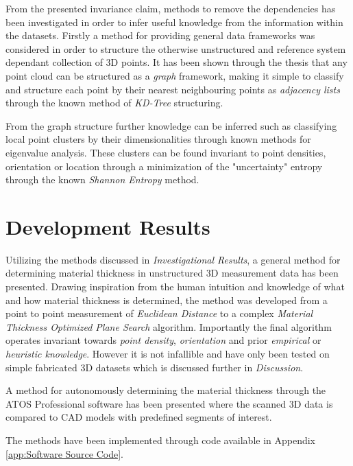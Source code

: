 \documentclass[%
]{USN-MSc}
\begin{document}
From the presented invariance claim, methods to remove the dependencies has been investigated in order to infer useful knowledge from the information within the datasets. Firstly a method for providing general data frameworks was considered in order to structure the otherwise unstructured and reference system dependant collection of 3D points. It has been shown through the thesis that any point cloud can be structured as a \textit{graph} framework, making it simple to classify and structure each point by their nearest neighbouring points as \textit{adjacency lists} through the known method of \textit{KD-Tree} structuring.

From the graph structure further knowledge can be inferred such as classifying local point clusters by their dimensionalities through known methods for eigenvalue analysis. These clusters can be found invariant to point densities, orientation or location through a minimization of the "uncertainty" entropy through the known \textit{Shannon Entropy} method.

\section{Development Results}
Utilizing the methods discussed in \textit{Investigational Results}, a general method for determining material thickness in unstructured 3D measurement data has been presented. Drawing inspiration from the human intuition and knowledge of what and how material thickness is determined, the method was developed from a point to point measurement of \textit{Euclidean Distance} to a complex \textit{Material Thickness Optimized Plane Search} algorithm. Importantly the final algorithm operates invariant towards \textit{point density}, \textit{orientation} and prior \textit{empirical} or \textit{heuristic knowledge}. However it is not infallible and have only been tested on simple fabricated 3D datasets which is discussed further in \textit{Discussion}.

A method for autonomously determining the material thickness through the ATOS Professional software has been presented where the scanned 3D data is compared to CAD models with predefined segments of interest. 

The methods have been implemented through code available in Appendix \ref{app:Software Source Code}.




\end{document}
